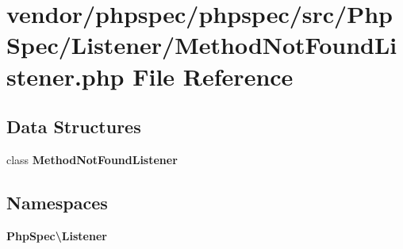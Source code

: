 \section{vendor/phpspec/phpspec/src/\+Php\+Spec/\+Listener/\+Method\+Not\+Found\+Listener.php File Reference}
\label{_method_not_found_listener_8php}
\subsection*{Data Structures}
\begin{DoxyCompactItemize}
\item 
class {\bf Method\+Not\+Found\+Listener}
\end{DoxyCompactItemize}
\subsection*{Namespaces}
\begin{DoxyCompactItemize}
\item 
 {\bf Php\+Spec\textbackslash{}\+Listener}
\end{DoxyCompactItemize}
